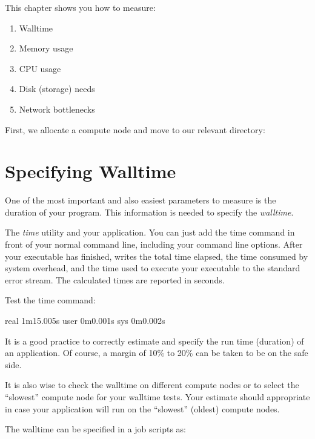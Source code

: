 This chapter shows you how to measure:

\begin{enumerate}
\item  Walltime
\item  Memory usage
\item  CPU usage
\item  Disk (storage) needs
\item  Network bottlenecks
\end{enumerate}

First, we allocate a compute node and move to our relevant directory:

\begin{prompt}
\end{prompt}

\section{Specifying Walltime}
\label{sec:specifying-walltime-requirements}

One of the most important and also easiest parameters to measure is the
duration of your program. This information is needed to specify the
\emph{walltime}.

The \emph{time} utility  and  your application.
You can just add the time command in front of your normal command line,
including your command line options. After your executable has finished,
 writes the total time elapsed, the time consumed by system
overhead, and the time used to execute your executable to the standard error
stream. The calculated times are reported in seconds.


Test the time command:

\begin{prompt}
real 1m15.005s
user 0m0.001s
sys 0m0.002s
\end{prompt}

It is a good practice to correctly estimate and specify the run time (duration)
of an application. Of course, a margin of 10\% to 20\% can be taken to be on
the safe side.

It is also wise to check the walltime on different compute nodes or to select
the ``slowest'' compute node for your walltime tests. Your estimate should
appropriate in case your application will run on the ``slowest'' (oldest)
compute nodes.

The walltime can be specified in a job scripts as:

